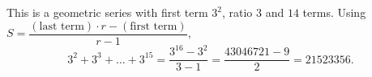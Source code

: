 This is a geometric series with first term $3^2$, ratio $3$ and $14$ terms. Using $S=\dfrac{(\text{last term})\cdot r-(\text{first term})}{r-1}$,
\[
3^2+3^3+\dots+3^{15}=\dfrac{3^{16}-3^2}{3-1}=\dfrac{43046721-9}{2}=\boxed{21523356}.
\]
